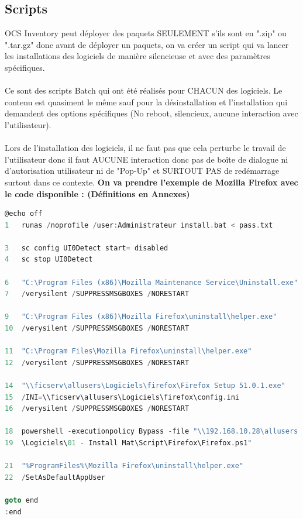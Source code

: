 \documentclass[11pt,a4paper,oneside]{article}
\begin{document}
\subsection{Scripts}

OCS Inventory peut déployer des paquets SEULEMENT s'ils sont en ".zip" ou ".tar.gz" donc avant de déployer un paquets, on va créer un script qui va lancer les installations des logiciels de manière silencieuse et avec des paramètres spécifiques.
\\ \\
Ce sont des scripts Batch qui ont été réalisés pour CHACUN des logiciels. Le contenu est quasiment le même sauf pour la désinstallation et l'installation qui demandent des options spécifiques (No reboot, silencieux, aucune interaction avec l'utilisateur).
\\ \\
Lors de l'installation des logiciels, il ne faut pas que cela perturbe le travail de l'utilisateur donc il faut AUCUNE interaction donc pas de boîte de dialogue ni d'autorisation utilisateur ni de "Pop-Up" et SURTOUT PAS de redémarrage surtout dans ce contexte.
\newpage
\textbf{On va prendre l'exemple de Mozilla Firefox avec le code disponible : (Définitions en Annexes)}
\\
\begin{lstlisting}[language=C]
@echo off
1	runas /noprofile /user:Administrateur install.bat < pass.txt
	
3	sc config UI0Detect start= disabled
4	sc stop UI0Detect

6	"C:\Program Files (x86)\Mozilla Maintenance Service\Uninstall.exe" 
7	/verysilent /SUPPRESSMSGBOXES /NORESTART
	
9	"C:\Program Files (x86)\Mozilla Firefox\uninstall\helper.exe" 
10	/verysilent /SUPPRESSMSGBOXES /NORESTART
	
11	"C:\Program Files\Mozilla Firefox\uninstall\helper.exe" 
12	/verysilent /SUPPRESSMSGBOXES /NORESTART	

14	"\\ficserv\allusers\Logiciels\firefox\Firefox Setup 51.0.1.exe" 
15	/INI=\\ficserv\allusers\Logiciels\firefox\config.ini 
16	/verysilent /SUPPRESSMSGBOXES /NORESTART
	
18	powershell -executionpolicy Bypass -file "\\192.168.10.28\allusers
19	\Logiciels\01 - Install Mat\Script\Firefox\Firefox.ps1"	
	
21	"%ProgramFiles%\Mozilla Firefox\uninstall\helper.exe" 
22	/SetAsDefaultAppUser
	
goto end
:end	
\end{lstlisting}
\end{document}
